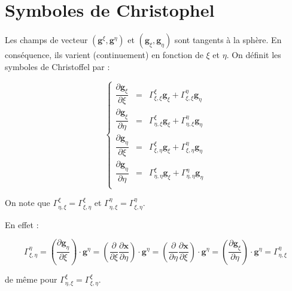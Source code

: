 \section{Symboles de Christophel}

Les champs de vecteur $( \mathbf{g}^{\xi}, \mathbf{g}^{\eta})$ et $( \mathbf{g}_ {\xi}, \mathbf{g}_{\eta})$ sont tangents à la sphère. En conséquence, ils varient (continuement) en fonction de $\xi$ et $\eta$. On définit les symboles de Christoffel par :

\begin{equation}
\left\lbrace
\begin{array}{rcl}
\dfrac{\partial \mathbf{g}_{\xi}}{\partial \xi} & = & \Gamma_{\xi,\xi}^{\xi} \mathbf{g}_{\xi} + \Gamma_{\xi,\xi}^{\eta} \mathbf{g}_{\eta}\\

\dfrac{\partial \mathbf{g}_{\xi}}{\partial \eta} & = & \Gamma_{\eta,\xi}^{\xi} \mathbf{g}_{\xi} + \Gamma_{\eta,\xi}^{\eta} \mathbf{g}_{\eta}\\

\dfrac{\partial \mathbf{g}_{\eta}}{\partial \xi} & = & \Gamma_{\xi,\eta}^{\xi} \mathbf{g}_{\xi} + \Gamma_{\xi,\eta}^{\eta} \mathbf{g}_{\eta}\\

\dfrac{\partial \mathbf{g}_{\eta}}{\partial \eta} & = & \Gamma_{\eta,\eta}^{\xi} \mathbf{g}_{\xi} + \Gamma_{\eta,\eta}^{\eta} \mathbf{g}_{\eta}\\
\end{array}
\right.
\end{equation}

\begin{remarque}
On note que $\Gamma_{\eta,\xi}^{\xi}=\Gamma_{\xi,\eta}^{\xi}$ et $\Gamma_{\eta,\xi}^{\eta}=\Gamma_{\xi,\eta}^{\eta}$.

En effet :

$$\Gamma_{\xi, \eta}^{\eta} = \left( \dfrac{\partial \mathbf{g}_{\eta}}{\partial \xi} \right) \cdot \mathbf{g}^{\eta} = \left( \dfrac{\partial}{\partial \xi} \dfrac{\partial \mathbf{x}}{\partial \eta} \right) \cdot \mathbf{g}^{\eta} = \left( \dfrac{\partial}{\partial \eta} \dfrac{\partial \mathbf{x}}{\partial \xi} \right) \cdot \mathbf{g}^{\eta} = \left( \dfrac{\partial \mathbf{g}_{\xi}}{\partial \eta} \right) \cdot \mathbf{g}^{\eta} = \Gamma_{\eta, \xi}^{\eta}$$

de même pour $\Gamma_{\eta,\xi}^{\xi}=\Gamma_{\xi,\eta}^{\xi}$.
\end{remarque}

